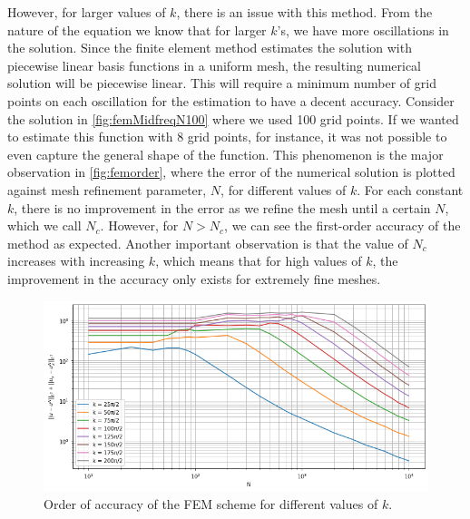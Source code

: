 However, for larger values of $k$, there is an issue with this method. From the nature of the equation we know that for larger $k$'s, we have more oscillations in the solution. Since the finite element method estimates the solution with piecewise linear basis functions in a uniform mesh, the resulting numerical solution will be piecewise linear. This will require a minimum number of grid points on each oscillation for the estimation to have a decent accuracy. Consider the solution in \autoref{fig:femMidfreqN100} where we used 100 grid points. If we wanted to estimate this function with 8 grid points, for instance, it was not possible to even capture the general shape of the function. This phenomenon is the major observation in \autoref{fig:femorder}, where the error of the numerical solution is plotted against mesh refinement parameter, $N$, for different values of $k$. For each constant $k$, there is no improvement in the error as we refine the mesh until a certain $N$, which we call $N_c$. However, for $N > N_c$, we can see the first-order accuracy of the method as expected. Another important observation is that the value of $N_c$ increases with increasing $k$, which means that for high values of $k$, the improvement in the accuracy only exists for extremely fine meshes.

\begin{figure}[h!]
    \centering
    \includegraphics[width=.7\textwidth]{img/FEM-Order-Homog-H1.png}
    \caption{Order of accuracy of the FEM scheme for different values of $k$.}
    \label{fig:femorder}
\end{figure}

